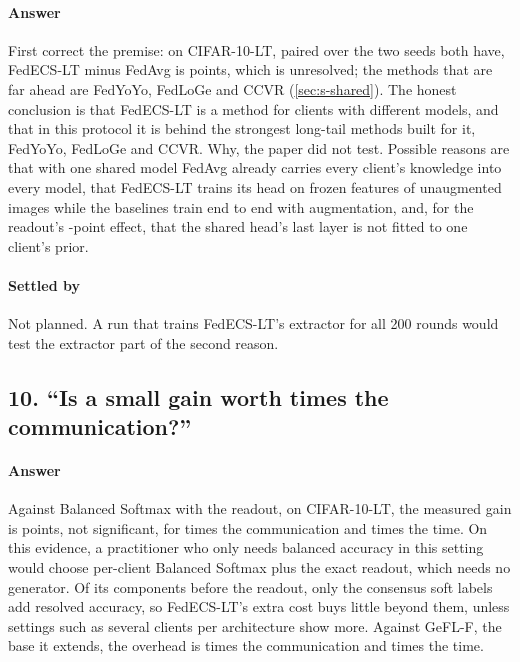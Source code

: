 \paragraph{Answer} First correct the premise: on CIFAR-10-LT, paired over the two seeds both have, FedECS-LT minus FedAvg is   points, which is unresolved; the
methods that are far ahead are FedYoYo, FedLoGe and CCVR (\cref{sec:s-shared}). The honest conclusion is that
FedECS-LT is a method for clients with different models, and that in this protocol it is behind the strongest long-tail
methods built for it, FedYoYo, FedLoGe and CCVR. Why, the paper did not test. Possible reasons are that with one shared model FedAvg already carries
every client's knowledge into every model, that FedECS-LT trains its head on frozen features of unaugmented images
while the baselines train end to end with augmentation, and, for the readout's
-point effect, that the shared head's last layer is not fitted to one client's
prior.

\paragraph{Settled by} Not planned. A run that trains FedECS-LT's extractor for all 200 rounds would test the
extractor part of the second reason.

\subsection*{10. ``Is a small gain worth  times the communication?''}

\paragraph{Answer} Against Balanced Softmax with the readout, on CIFAR-10-LT, the measured gain is
 points, not significant, for  times the
communication and  times the time. On this evidence, a practitioner who only needs
balanced accuracy in this setting would choose per-client Balanced Softmax plus the exact readout, which needs no
generator. Of its components before the readout, only the consensus soft labels add resolved accuracy, so FedECS-LT's
extra cost buys little beyond them, unless settings such as several clients per architecture show more. Against
GeFL-F, the base it extends, the overhead is  times the communication and
 times the time.

